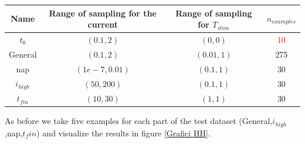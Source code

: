 \documentclass{article}
\begin{document}
\begin{center}
    \begin{tabular}{cccc}
        \hline
        Name       & Range of sampling for the current & Range of sampling for $T_{stim}$ & $n_{examples}$      \\
        \hline\hline
        $t_0$      & $(0.1,2)$                         & $(0,0)$                          & \textcolor{red}{10} \\
        General    & $(0.1,2)$                         & $(0.01,1)$                       & 275                 \\
        nap        & $(1e-7,0.01)$                     & $(0.1,1)$                        & 30                  \\
        $i_{high}$ & $(50,200)$                        & $(0.1,1)$                        & 30                  \\
        $t_{fin}$  & $(10,30)$                         & $(1,1)$                          & 30                  \\
        \hline
    \end{tabular}
\end{center}
As before we take five examples for each part of the test dataset (General,$i_{high}$,nap,$t_fin$) and visualize the results in figure \ref{Grafici HH}.
\end{document}
